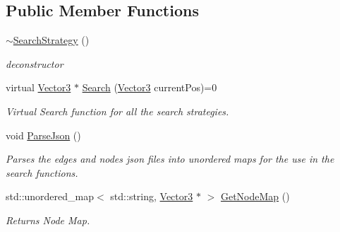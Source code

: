\subsection*{Public Member Functions}
\begin{DoxyCompactItemize}
\item 
\mbox{\label{classSearchStrategy_a682f312091a92abea5963922213f9040}} 
\hyperlink{classSearchStrategy_a682f312091a92abea5963922213f9040}{$\sim$\+Search\+Strategy} ()
\begin{DoxyCompactList}\small\item\em deconstructor \end{DoxyCompactList}\item 
\mbox{\label{classSearchStrategy_aa7fa1b7292b6a4ebbf370fbf148f6d8d}} 
virtual \hyperlink{classVector3}{Vector3} $\ast$ \hyperlink{classSearchStrategy_aa7fa1b7292b6a4ebbf370fbf148f6d8d}{Search} (\hyperlink{classVector3}{Vector3} current\+Pos)=0
\begin{DoxyCompactList}\small\item\em Virtual Search function for all the search strategies. \end{DoxyCompactList}\item 
\mbox{\label{classSearchStrategy_a2a9876ed7bd7c1ecf8f2255ba33a3d18}} 
void \hyperlink{classSearchStrategy_a2a9876ed7bd7c1ecf8f2255ba33a3d18}{Parse\+Json} ()
\begin{DoxyCompactList}\small\item\em Parses the edges and nodes json files into unordered maps for the use in the search functions. \end{DoxyCompactList}\item 
\mbox{\label{classSearchStrategy_adb1bd35ae29b52a2c3222435f797505e}} 
std\+::unordered\+\_\+map$<$ std\+::string, \hyperlink{classVector3}{Vector3} $\ast$ $>$ \hyperlink{classSearchStrategy_adb1bd35ae29b52a2c3222435f797505e}{Get\+Node\+Map} ()
\begin{DoxyCompactList}\small\item\em Returns Node Map. \end{DoxyCompactList}\item 
\mbox{\label{classSearchStrategy_af95de6417f719214be12f4678dd48b6d}} 

\end{DoxyCompactItemize}
